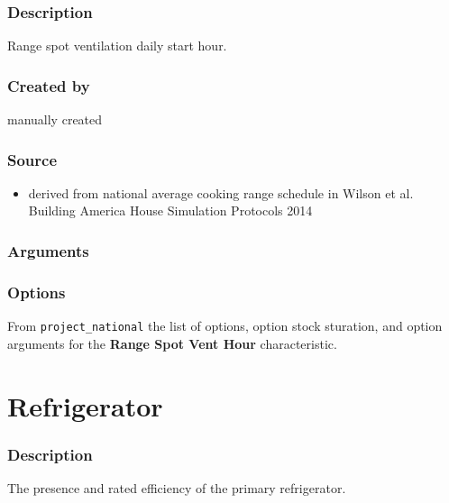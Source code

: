 \subsubsection{Description}\label{description-133}

Range spot ventilation daily start hour.

\subsubsection{Created by}\label{created-by-134}

manually created

\subsubsection{Source}\label{source-136}

\begin{itemize}
 
\item
  derived from national average cooking range schedule in Wilson et al.
  \textquotesingle Building America House Simulation
  Protocols\textquotesingle{} 2014
\end{itemize}

\subsubsection{Arguments}\label{arguments-95}


\subsubsection{Options}\label{options-137}

From \texttt{project\_national} the list of options, option stock
sturation, and option arguments for the \textbf{Range Spot Vent Hour}
characteristic.



\section{Refrigerator}\label{refrigerator}

\subsubsection{Description}\label{description-134}

The presence and rated efficiency of the primary refrigerator.

